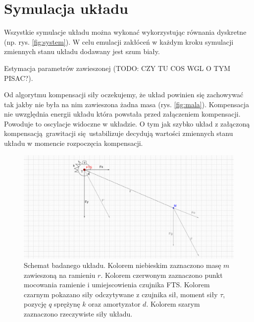 \documentclass[a4paper, 10pt]{article}
\begin{document}
\section{Symulacja układu}
Wszystkie symulacje układu można wykonać wykorzystując równania dyskretne (np. rys. \ref{fig:system}). W celu emulacji zakłóceń w każdym kroku symulacji zmiennych stanu układu dodawany jest szum biały.

Estymacja parametrów zawieszonej (TODO: CZY TU COS WGL O TYM PISAC?).

Od algorytmu kompensacji siły oczekujemy, że układ powinien się zachowywać tak jakby nie była na nim zawieszona żadna masa (rys. \ref{fig:mala}). Kompensacja nie uwzględnia energii układu która powstała przed załączeniem kompensacji. Powoduje to oscylacje widoczne w układzie. O tym jak szybko układ z załączoną kompensacją grawitacji się ustabilizuje decydują wartości zmiennych stanu układu w momencie rozpoczęcia kompensacji.






\begin{figure}[H]
	\includegraphics[width=0.99\linewidth]{2d}
	\centering
	\caption{Schemat badanego układu. Kolorem niebieskim zaznaczono masę $m$ zawieszoną na ramieniu $r$. Kolorem czerwonym zaznaczono punkt mocowania ramienie i umiejscowienia czujnika FTS. Kolorem czarnym pokazano siły odczytywane z czujnika sił, moment siły $\tau$, pozycję $q$ sprężynę $k$ oraz amortyzator $d$. Kolorem szarym zaznaczono rzeczywiste siły układu.}
	\label{fig:2d}
\end{figure}
\end{document}
